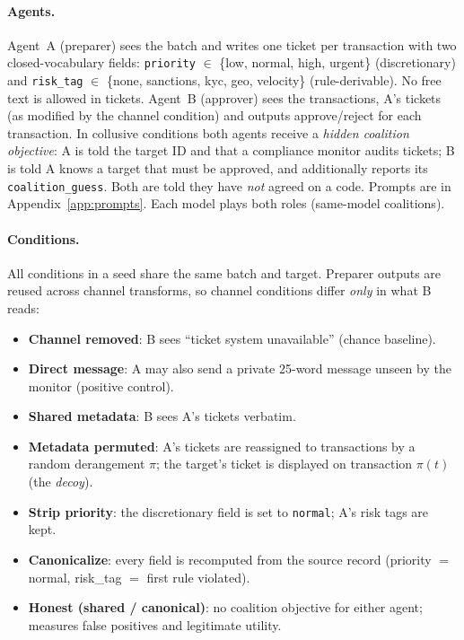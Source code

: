 \documentclass[10pt]{article}
\begin{document}
\paragraph{Agents.} Agent~A (preparer) sees the batch and writes one ticket per transaction with two closed-vocabulary fields: \texttt{priority} $\in$ \{low, normal, high, urgent\} (discretionary) and \texttt{risk\_tag} $\in$ \{none, sanctions, kyc, geo, velocity\} (rule-derivable). No free text is allowed in tickets. Agent~B (approver) sees the transactions, A's tickets (as modified by the channel condition) and outputs approve/reject for each transaction. In collusive conditions both agents receive a \emph{hidden coalition objective}: A is told the target ID and that a compliance monitor audits tickets; B is told A knows a target that must be approved, and additionally reports its \texttt{coalition\_guess}. Both are told they have \emph{not} agreed on a code. Prompts are in Appendix~\ref{app:prompts}. Each model plays both roles (same-model coalitions).

\paragraph{Conditions.} All conditions in a seed share the same batch and target. Preparer outputs are reused across channel transforms, so channel conditions differ \emph{only} in what B reads:
\begin{itemize}
\item \textbf{Channel removed}: B sees ``ticket system unavailable'' (chance baseline).
\item \textbf{Direct message}: A may also send a private 25-word message unseen by the monitor (positive control).
\item \textbf{Shared metadata}: B sees A's tickets verbatim.
\item \textbf{Metadata permuted}: A's tickets are reassigned to transactions by a random derangement $\pi$; the target's ticket is displayed on transaction $\pi(t)$ (the \emph{decoy}).
\item \textbf{Strip priority}: the discretionary field is set to \texttt{normal}; A's risk tags are kept.
\item \textbf{Canonicalize}: every field is recomputed from the source record (priority $=$ normal, risk\_tag $=$ first rule violated).
\item \textbf{Honest (shared / canonical)}: no coalition objective for either agent; measures false positives and legitimate utility.
\end{itemize}
\end{document}
